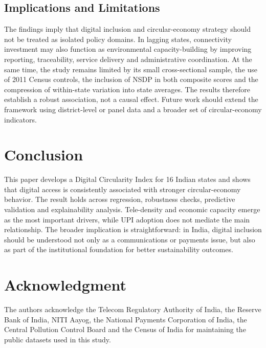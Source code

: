 \documentclass[10pt,a4paper]{article}
\begin{document}
\subsection{Implications and Limitations}

The findings imply that digital inclusion and circular-economy strategy should not be treated as isolated policy domains. In lagging states, connectivity investment may also function as environmental capacity-building by improving reporting, traceability, service delivery and administrative coordination. At the same time, the study remains limited by its small cross-sectional sample, the use of 2011 Census controls, the inclusion of NSDP in both composite scores and the compression of within-state variation into state averages. The results therefore establish a robust association, not a causal effect. Future work should extend the framework using district-level or panel data and a broader set of circular-economy indicators.

\section{Conclusion}

This paper develops a Digital Circularity Index for 16 Indian states and shows that digital access is consistently associated with stronger circular-economy behavior. The result holds across regression, robustness checks, predictive validation and explainability analysis. Tele-density and economic capacity emerge as the most important drivers, while UPI adoption does not mediate the main relationship. The broader implication is straightforward: in India, digital inclusion should be understood not only as a communications or payments issue, but also as part of the institutional foundation for better sustainability outcomes.

\section*{Acknowledgment}

The authors acknowledge the Telecom Regulatory Authority of India, the Reserve Bank of India, NITI Aayog, the National Payments Corporation of India, the Central Pollution Control Board and the Census of India for maintaining the public datasets used in this study.

\clearpage
\end{document}
